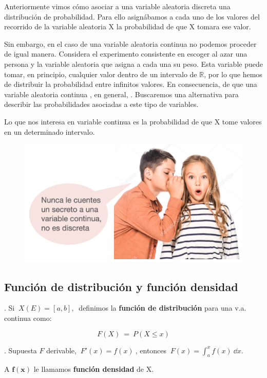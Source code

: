 Anteriormente vimos cómo asociar a una variable aleatoria discreta una distribución de probabilidad. Para ello asignábamos a cada uno de los valores del recorrido de la variable aleatoria X la probabilidad de que X tomara ese valor.

Sin embargo, en el caso de una variable aleatoria continua no podemos proceder de igual manera. Considera el experimento consistente en escoger al azar una persona y la variable aleatoria que asigna a cada una su peso. Esta variable puede tomar, en principio, cualquier valor dentro de un intervalo de $\mathbb R$, por lo que hemos de distribuir la probabilidad entre infinitos valores. En consecuencia,  de que una variable aleatoria continua , en general, . Buscaremos una alternativa para describir las probabilidades asociadas a este tipo de variables.

Lo que nos interesa en variable continua es la probabilidad de que X tome valores en un determinado intervalo.

	\begin{figure}[H]
	\centering
	\includegraphics[width=.6\textwidth]{imagenes/imagenes04/T04IM07.png}
	\end{figure}


\subsection{Función de distribución y función densidad}

\begin{definition}
.	Si $\ X(E)=[a,b],\ $ definimos	la \textbf{función de distribución} para una v.a. continua como:

$$F(X)\ = \ P(X\le x)$$
\end{definition}

\begin{definition}
.	Supuesta $F$ derivable, $\ F'(x)=f(x) \ $, entonces $\ F(x)=\displaystyle \int_a^x f(x) \ \dd x$.

A $\boldsymbol {f(x)}$ le llamamos \textbf{función densidad} de X.
\end{definition}

